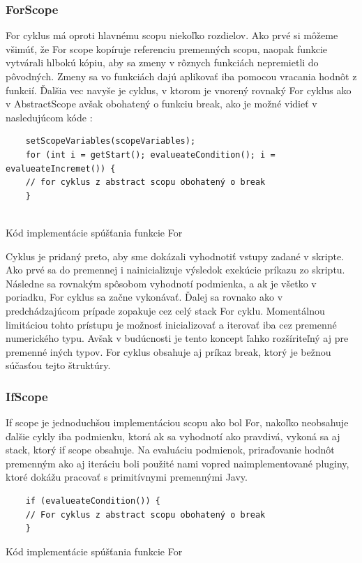 \subsubsection{ForScope}
\indent For cyklus má oproti hlavnému scopu niekoľko rozdielov. Ako prvé si môžeme všimúť, že For scope kopíruje referenciu premenných scopu, naopak funkcie vytvárali hlbokú kópiu, aby sa zmeny v rôznych funkciách nepremietli do pôvodných. Zmeny sa vo funkciách dajú aplikovať iba pomocou vracania hodnôt z funkcií. Ďalšia vec navyše je cyklus, v ktorom je vnorený rovnaký For cyklus ako v AbstractScope avšak obohatený o funkciu break, ako je možné vidieť v nasledujúcom kóde :
\begin{algorithm}[H]
	\begin{verbatim}
	setScopeVariables(scopeVariables);
	for (int i = getStart(); evalueateCondition(); i = evalueateIncremet()) {
	// for cyklus z abstract scopu obohatený o break
	}
	
	\end{verbatim}
	\caption{Kód implementácie spúšťania funkcie For}
	\label{alg:gen}
\end{algorithm}
\indent Cyklus je pridaný preto, aby sme dokázali vyhodnotiť vstupy zadané v skripte. Ako prvé sa do premennej i nainicializuje výsledok exekúcie príkazu zo skriptu. Následne sa rovnakým spôsobom vyhodnotí podmienka, a ak je všetko v poriadku, For cyklus sa začne vykonávať. Ďalej sa rovnako ako v predchádzajúcom prípade zopakuje cez celý stack For cyklu. Momentálnou limitáciou tohto prístupu je možnosť inicializovať a iterovať iba cez premenné numerického typu. Avšak v budúcnosti je tento koncept ľahko rozšíriteľný aj pre premenné iných typov. For cyklus obsahuje aj príkaz break, ktorý je bežnou súčasťou tejto štruktúry.
\subsubsection{IfScope}
\indent If scope je jednoduchšou implementáciou scopu ako bol For, nakoľko neobsahuje ďalšie cykly iba podmienku, ktorá ak sa vyhodnotí ako pravdivá, vykoná sa aj stack, ktorý if scope obsahuje. Na evaluáciu podmienok, priraďovanie hodnôt premenným ako aj iteráciu boli použité nami vopred naimplementované pluginy, ktoré dokážu pracovať s primitívnymi premennými Javy. 
\begin{algorithm}[H]
	\begin{verbatim}
	if (evalueateCondition()) {
	// For cyklus z abstract scopu obohatený o break
	}
	\end{verbatim}
	\caption{Kód implementácie spúšťania funkcie For}
	\label{alg:gen}
\end{algorithm}
